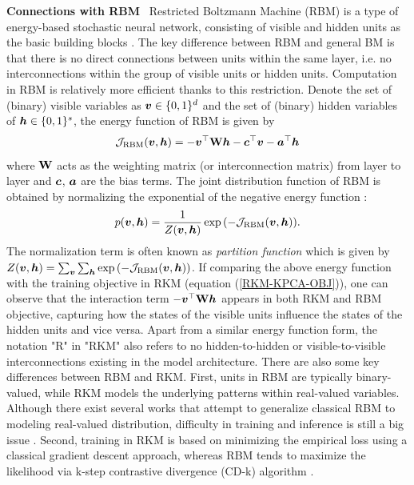 \noindent\textbf{Connections with RBM} \ Restricted Boltzmann Machine (RBM) is a type of energy-based stochastic neural network, consisting of visible and hidden units as the basic building blocks \cite{zhangOverviewRestrictedBoltzmann2018, fischerIntroductionRestrictedBoltzmann2012}. The key difference between RBM and general BM is that there is no direct connections between units within the same layer, i.e. no interconnections within the group of visible units or hidden units. Computation in RBM is relatively more efficient thanks to this restriction. Denote the set of (binary) visible variables as $\boldsymbol{v} \in \{0,1\}^{d}$ and the set of (binary) hidden variables of $\boldsymbol{h} \in \{0,1\}^{s}$, the energy function of RBM is given by
\begin{equation}
    \mathcal{J}_{\text{RBM}}(\boldsymbol{v},\boldsymbol{h}) = -\boldsymbol{v}^{\top}\mathbf{W}\boldsymbol{h} - \boldsymbol{c}^{\top}\boldsymbol{v} - \boldsymbol{a}^{\top}\boldsymbol{h}
\end{equation}
where $\mathbf{W}$ acts as the weighting matrix (or interconnection matrix) from layer to layer and $\boldsymbol{c}$, $\boldsymbol{a}$ are the bias terms. The joint distribution function of RBM  is obtained by normalizing the exponential of the negative energy function :
\begin{equation}
    p(\boldsymbol{v},\boldsymbol{h}) = \frac{1}{Z(\boldsymbol{v},\boldsymbol{h})} \exp{(-\mathcal{J}_{\text{RBM}}(\boldsymbol{v},\boldsymbol{h}))}.
\end{equation}
The normalization term is often known as \emph{partition function} which is given by $Z(\boldsymbol{v},\boldsymbol{h}) = \sum_{\boldsymbol{v}}\sum_{\boldsymbol{h}}\exp{(-\mathcal{J}_{\text{RBM}}(\boldsymbol{v},\boldsymbol{h}))}$. If comparing the above energy function with the training objective in RKM (equation (\ref{RKM-KPCA-OBJ})), one can observe that the interaction term $-\boldsymbol{v}^{\top}\mathbf{W}\boldsymbol{h}$ appears in both RKM and RBM objective, capturing how the states of the visible units influence the states of the hidden units and vice versa. Apart from a similar energy function form, the notation "R" in "RKM" also refers to no hidden-to-hidden or visible-to-visible interconnections existing in the model architecture. There are also some key differences between RBM and RKM. First, units in RBM are typically binary-valued, while RKM models the underlying patterns within real-valued variables. Although there exist several works \cite{hintonFastLearningAlgorithm2006, wangAnalysisGaussianbinaryRestricted2012, ranzatoFactored3WayRestricted2010} that attempt to generalize classical RBM to modeling real-valued distribution, difficulty in training and inference is still a big issue \cite{wangAnalysisGaussianbinaryRestricted2012}. Second, training in RKM is based on minimizing the empirical loss using a classical gradient descent approach, whereas RBM tends to maximize the likelihood via k-step contrastive divergence (CD-k) algorithm \cite{carreira-perpinanContrastiveDivergenceLearning2005}.

